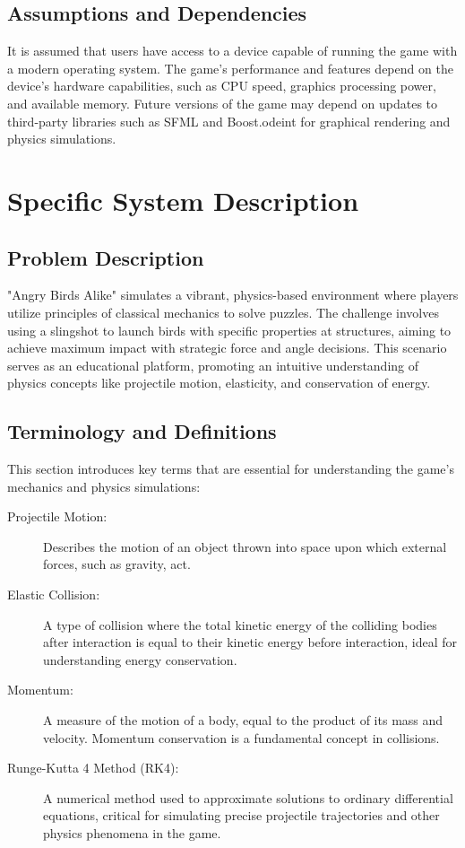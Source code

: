 \documentclass[12pt]{article}
\begin{document}
\subsection{Assumptions and Dependencies}

It is assumed that users have access to a device capable of running the game with a modern operating system. The game's performance and features depend on the device's hardware capabilities, such as CPU speed, graphics processing power, and available memory. Future versions of the game may depend on updates to third-party libraries such as SFML and Boost.odeint for graphical rendering and physics simulations.

\section{Specific System Description}

\subsection{Problem Description}
"Angry Birds Alike" simulates a vibrant, physics-based environment where players utilize principles of classical mechanics to solve puzzles. The challenge involves using a slingshot to launch birds with specific properties at structures, aiming to achieve maximum impact with strategic force and angle decisions. This scenario serves as an educational platform, promoting an intuitive understanding of physics concepts like projectile motion, elasticity, and conservation of energy.

\subsection{Terminology and Definitions}
This section introduces key terms that are essential for understanding the game's mechanics and physics simulations:

\begin{description}
\item[Projectile Motion:] Describes the motion of an object thrown into space upon which external forces, such as gravity, act.
\item[Elastic Collision:] A type of collision where the total kinetic energy of the colliding bodies after interaction is equal to their kinetic energy before interaction, ideal for understanding energy conservation.
\item[Momentum:] A measure of the motion of a body, equal to the product of its mass and velocity. Momentum conservation is a fundamental concept in collisions.
\item[Runge-Kutta 4 Method (RK4):] A numerical method used to approximate solutions to ordinary differential equations, critical for simulating precise projectile trajectories and other physics phenomena in the game.
\end{description}
\end{document}
